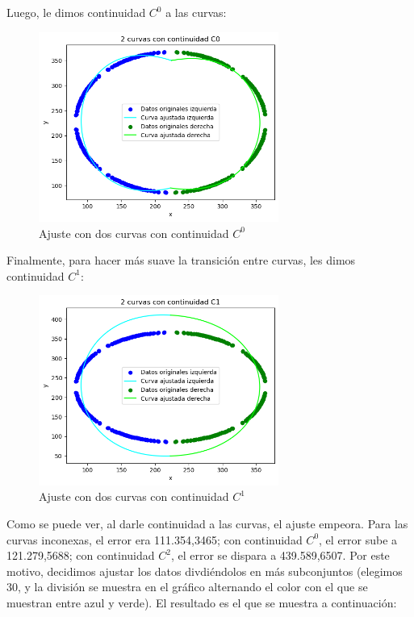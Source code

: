 \documentclass{article}
\begin{document}
Luego, le dimos continuidad $C^0$ a las curvas:

\begin{figure}[H]
    \centering
    \includegraphics[width=0.7\textwidth]{Imagenes/2_c0.png}
    \caption{Ajuste con dos curvas con continuidad $C^0$}
\end{figure}

Finalmente, para hacer más suave la transición entre curvas, les dimos continuidad $C^1$:

\begin{figure}[H]
    \centering
    \includegraphics[width=0.7\textwidth]{Imagenes/2_c1.png}
    \caption{Ajuste con dos curvas con continuidad $C^1$}
\end{figure}

Como se puede ver, al darle continuidad a las curvas, el ajuste empeora. Para las curvas inconexas, el error era 111.354,3465; con continuidad $C^0$, el error sube a 121.279,5688; con continuidad $C^2$, el error se dispara a 439.589,6507. Por este motivo, decidimos ajustar los datos divdiéndolos en más subconjuntos (elegimos 30, y la división se muestra en el gráfico alternando el color con el que se muestran entre azul y verde). El resultado es el que se muestra a continuación:
\end{document}
